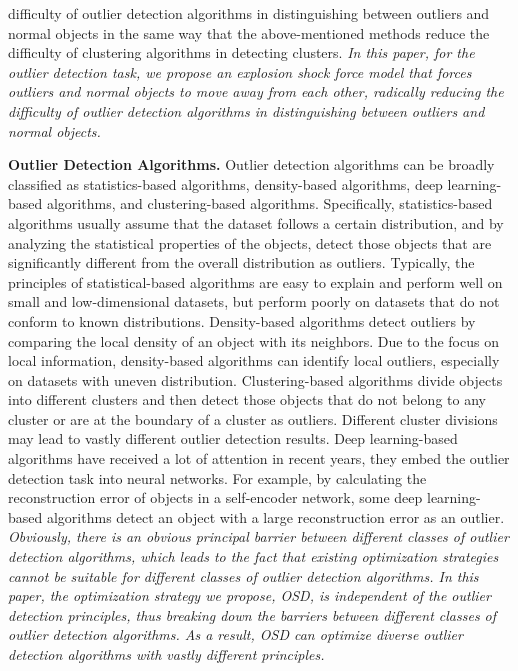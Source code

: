 difficulty of outlier detection algorithms in distinguishing between outliers and normal objects in the same way that the above-mentioned methods reduce the difficulty of clustering algorithms in detecting clusters. \emph{In this paper, for the outlier detection task, we propose an explosion shock force model that forces outliers and normal objects to move away from each other, radically reducing the difficulty of outlier detection algorithms in distinguishing between outliers and normal objects.}


\textbf{Outlier Detection Algorithms.} Outlier detection algorithms can be broadly classified as statistics-based algorithms, density-based algorithms, deep learning-based algorithms, and clustering-based algorithms. Specifically, statistics-based algorithms \cite{aydin2023boundary, li2023ecod, li2020copod, rousseeuw2011robust} usually assume that the dataset follows a certain distribution, and by analyzing the statistical properties of the objects, detect those objects that are significantly different from the overall distribution as outliers. Typically, the principles of statistical-based algorithms are easy to explain and perform well on small and low-dimensional datasets, but perform poorly on datasets that do not conform to known distributions. Density-based algorithms \cite{huang2023novel, zhou2024outlier, aydin2023boundary, breunig2000lof} detect outliers by comparing the local density of an object with its neighbors. Due to the focus on local information, density-based algorithms can identify local outliers, especially on datasets with uneven distribution. Clustering-based algorithms \cite{chen2021block, li2024detecting, rodriguez2014clustering} divide objects into different clusters and then detect those objects that do not belong to any cluster or are at the boundary of a cluster as outliers. Different cluster divisions may lead to vastly different outlier detection results. Deep learning-based algorithms \cite{hojjati2024dasvdd, goodge2022lunar, liu2021rca} have received a lot of attention in recent years, they embed the outlier detection task into neural networks. For example, by calculating the reconstruction error of objects in a self-encoder network, some deep learning-based algorithms detect an object with a large reconstruction error as an outlier. \emph{Obviously, there is an obvious principal barrier between different classes of outlier detection algorithms, which leads to the fact that existing optimization strategies cannot be suitable for different classes of outlier detection algorithms. In this paper, the optimization strategy we propose, OSD, is independent of the outlier detection principles, thus breaking down the barriers between different classes of outlier detection algorithms. As a result, OSD can optimize diverse outlier detection algorithms with vastly different principles.}